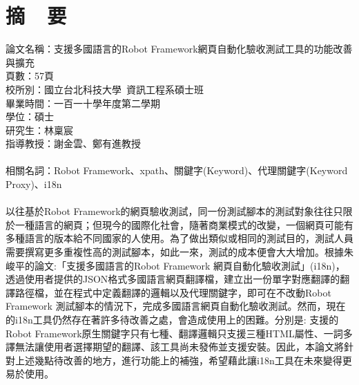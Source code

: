 \chapter*{摘~~要}


\noindent
論文名稱：支援多國語言的Robot Framework網頁自動化驗收測試工具的功能改善與擴充\\
頁數：57頁\\
校所別：國立台北科技大學~資訊工程系碩士班\\
畢業時間：一百一十學年度第二學期\\
學位：碩士\\
研究生：林稟宸\\
指導教授：謝金雲、鄭有進教授\\
\hspace*{\fill}\\
\noindent
相關名詞：Robot Framework、xpath、關鍵字(Keyword)、代理關鍵字(Keyword Proxy)、i18n\\
\hspace*{\fill}\\
%
\indent
以往基於Robot Framework的網頁驗收測試，同一份測試腳本的測試對象往往只限於一種語言的網頁；但現今的國際化社會，隨著商業模式的改變，一個網頁可能有多種語言的版本給不同國家的人使用。為了做出類似或相同的測試目的，測試人員需要撰寫更多重複性高的測試腳本，如此一來，測試的成本便會大大增加。根據朱峻平的論文:「支援多國語言的Robot Framework 網頁自動化驗收測試」(i18n)，透過使用者提供的JSON格式多國語言網頁翻譯檔，建立出一份單字對應翻譯的翻譯路徑檔，並在程式中定義翻譯的邏輯以及代理關鍵字，即可在不改動Robot Framework 測試腳本的情況下，完成多國語言網頁自動化驗收測試。然而，現在的i18n工具仍然存在著許多待改善之處，會造成使用上的困難。分別是: 支援的Robot Framework原生關鍵字只有七種、翻譯邏輯只支援三種HTML屬性、一詞多譯無法讓使用者選擇期望的翻譯、該工具尚未發佈並支援安裝。因此，本論文將針對上述幾點待改善的地方，進行功能上的補強，希望藉此讓i18n工具在未來變得更易於使用。
